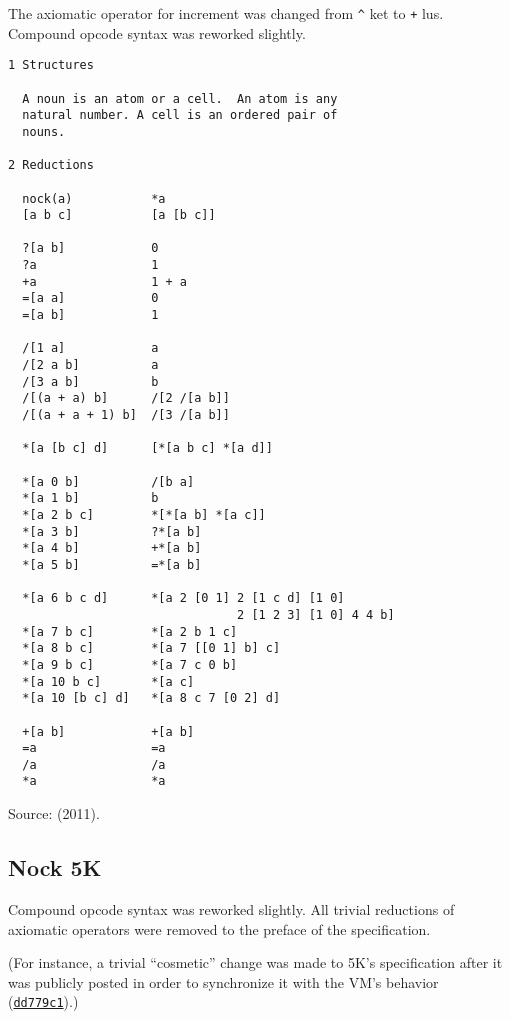\documentclass[twoside]{article}
\begin{document}
The axiomatic operator for increment was changed from \texttt{\textasciicircum} ket to \texttt{+} lus.  Compound opcode syntax was reworked slightly.

\begin{lstlisting}[label=lst:nock6k,caption={Nock 6K, 6 July 2011.},style=listingcode]
1 Structures

  A noun is an atom or a cell.  An atom is any
  natural number. A cell is an ordered pair of
  nouns.

2 Reductions

  nock(a)           *a
  [a b c]           [a [b c]]

  ?[a b]            0
  ?a                1
  +a                1 + a
  =[a a]            0
  =[a b]            1

  /[1 a]            a
  /[2 a b]          a
  /[3 a b]          b
  /[(a + a) b]      /[2 /[a b]]
  /[(a + a + 1) b]  /[3 /[a b]]

  *[a [b c] d]      [*[a b c] *[a d]]

  *[a 0 b]          /[b a]
  *[a 1 b]          b
  *[a 2 b c]        *[*[a b] *[a c]]
  *[a 3 b]          ?*[a b]
  *[a 4 b]          +*[a b]
  *[a 5 b]          =*[a b]

  *[a 6 b c d]      *[a 2 [0 1] 2 [1 c d] [1 0]
                                2 [1 2 3] [1 0] 4 4 b]
  *[a 7 b c]        *[a 2 b 1 c]
  *[a 8 b c]        *[a 7 [[0 1] b] c]
  *[a 9 b c]        *[a 7 c 0 b]
  *[a 10 b c]       *[a c]
  *[a 10 [b c] d]   *[a 8 c 7 [0 2] d]

  +[a b]            +[a b]
  =a                =a
  /a                /a
  *a                *a
\end{lstlisting}

Source:   (2011). %

\subsection{Nock 5K}

Compound opcode syntax was reworked slightly.  All trivial reductions of axiomatic operators were removed to the preface of the specification.

(For instance, a trivial ``cosmetic'' change was made to 5K's specification after it was publicly posted in order to synchronize it with the VM's behavior (\href{https://github.com/urbit/archaeology/commit/dd779c1e92d7200c2ce6c922052f1eb1d1642e4c}{\texttt{dd779c1}}).)
\end{document}
